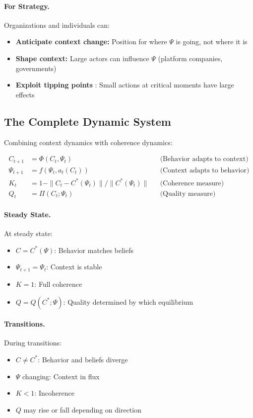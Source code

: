 \documentclass[12pt,a4paper]{article}
\begin{document}
\paragraph{For Strategy.}
Organizations and individuals can:
\begin{itemize}
  \item \textbf{Anticipate context change:} Position for where $\Psi$ is going, not where it is
  \item \textbf{Shape context:} Large actors can influence $\Psi$ (platform companies, governments)
  \item \textbf{Exploit tipping points} \citep{schelling1978}: Small actions at critical moments have large effects
\end{itemize}

\subsection{The Complete Dynamic System}

Combining context dynamics with coherence dynamics:

\begin{align}
  C_{t+1} &= \Phi(C_t, \Psi_t) && \text{(Behavior adapts to context)} \\
  \Psi_{t+1} &= f(\Psi_t, a_t(C_t)) && \text{(Context adapts to behavior)} \\
  K_t &= 1 - \|C_t - C^*(\Psi_t)\| / \|C^*(\Psi_t)\| && \text{(Coherence measure)} \\
  Q_t &= \Pi(C_t; \Psi_t) && \text{(Quality measure)}
\end{align}

\paragraph{Steady State.}
At steady state:
\begin{itemize}
  \item $C = C^*(\Psi)$: Behavior matches beliefs
  \item $\Psi_{t+1} = \Psi_t$: Context is stable
  \item $K = 1$: Full coherence
  \item $Q = Q(C^*; \Psi)$: Quality determined by which equilibrium
\end{itemize}

\paragraph{Transitions.}
During transitions:
\begin{itemize}
  \item $C \neq C^*$: Behavior and beliefs diverge
  \item $\Psi$ changing: Context in flux
  \item $K < 1$: Incoherence
  \item $Q$ may rise or fall depending on direction
\end{itemize}
\end{document}
